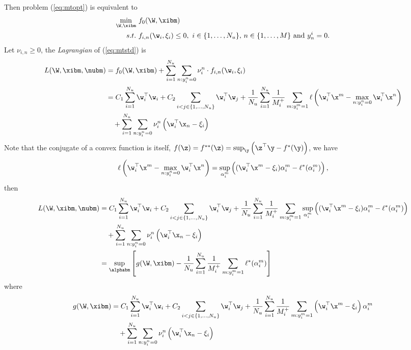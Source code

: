 Then problem (\ref{eq:mtopt}) is equivalent to 
\begin{equation}
\label{eq:mtstd}
\begin{aligned}
\min_{\W, \xibm} \ & f_0(\W, \xibm) \\
s.t. \ & f_{i,n}(\w_i, \xi_i) \le 0, \ i \in \{1,\dots,N_u\}, \, n \in \{1,\dots,M\} \ \mathrm{and} \ y_n^i = 0.
\end{aligned}
\end{equation}
Let $\nu_{i,n} \ge 0$, the \emph{Lagrangian} of (\ref{eq:mtstd}) is
\begin{equation*}
\begin{aligned}
L(\W, \xibm, \nubm) 
&= f_0(\W, \xibm) + \sum_{i=1}^{N_u} \sum_{n: y_i^n = 0} \nu_i^n \cdot f_{i,n}(\w_i, \xi_i) \\
&= C_1 \sum_{i=1}^{N_u} \w_i^\top \w_i + C_2 \sum_{i < j \in \{1,\dots,N_u\}} \w_i^\top \w_j
   + \frac{1}{N_u} \sum_{i = 1}^{N_u} \frac{1}{M_i^+} \sum_{m: y_i^m = 1} \ell \left( \w_i^\top \x^m - \max_{n: y_i^n = 0} \w_i^\top \x^n \right) \\
& \quad  + \sum_{i=1}^{N_u} \sum_{n: y_i^n = 0} \nu_i^n \left( \w_i^\top \x_n - \xi_i \right) \\
\end{aligned}
\end{equation*}
Note that the conjugate of a convex function is itself, \ie $f(\z) = f^{**}(\z) = \sup_\y \left( \z^\top \y - f^*(\y) \right)$, we have
\begin{equation*}
\begin{aligned}
\ell \left( \w_i^\top \x^m - \max_{n: y_i^n = 0} \w_i^\top \x^n \right) 
= \sup_{\alpha_i^m} \left( (\w_i^\top \x^m - \xi_i) \alpha_i^m - \ell^*(\alpha_i^m) \right),
\end{aligned}
\end{equation*}
then
\begin{equation*}
\begin{aligned}
L(\W, \xibm, \nubm) 
&= C_1 \sum_{i=1}^{N_u} \w_i^\top \w_i + C_2 \sum_{i < j \in \{1,\dots,N_u\}} \w_i^\top \w_j
   + \frac{1}{N_u} \sum_{i = 1}^{N_u} \frac{1}{M_i^+} \sum_{m: y_i^m = 1} 
     \sup_{\alpha_i^m} \left( (\w_i^\top \x^m - \xi_i) \alpha_i^m - \ell^*(\alpha_i^m) \right) \\
& \quad  + \sum_{i=1}^{N_u} \sum_{n: y_i^n = 0} \nu_i^n \left( \w_i^\top \x_n - \xi_i \right) \\
&= \sup_\alphabm \left[ g(\W, \xibm) - \frac{1}{N_u} \sum_{i = 1}^{N_u} \frac{1}{M_i^+} \sum_{m: y_i^m = 1} \ell^*(\alpha_i^m) \right]
\end{aligned}
\end{equation*}
where 
\begin{equation*}
\begin{aligned}
g(\W, \xibm)
&= C_1 \sum_{i=1}^{N_u} \w_i^\top \w_i + C_2 \sum_{i < j \in \{1,\dots,N_u\}} \w_i^\top \w_j
   + \frac{1}{N_u} \sum_{i = 1}^{N_u} \frac{1}{M_i^+} \sum_{m: y_i^m = 1} \left( \w_i^\top \x^m - \xi_i \right) \alpha_i^m \\
& \quad + \sum_{i=1}^{N_u} \sum_{n: y_i^n = 0} \nu_i^n \left( \w_i^\top \x_n - \xi_i \right)
\end{aligned}
\end{equation*}

